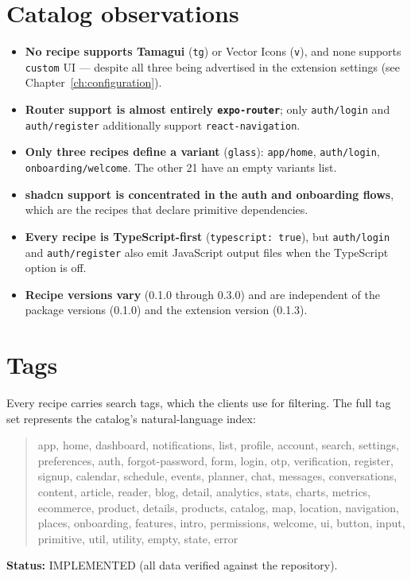 \section{Catalog observations}

\begin{itemize}
  \item \textbf{No recipe supports Tamagui} (\texttt{tg}) or Vector Icons
        (\texttt{v}), and none supports \texttt{custom} UI --- despite all three
        being advertised in the extension settings (see
        Chapter~\ref{ch:configuration}).
  \item \textbf{Router support is almost entirely \texttt{expo-router}}; only
        \texttt{auth/login} and \texttt{auth/register} additionally support
        \texttt{react-navigation}.
  \item \textbf{Only three recipes define a variant} (\texttt{glass}):
        \texttt{app/home}, \texttt{auth/login}, \texttt{onboarding/welcome}. The
        other 21 have an empty variants list.
  \item \textbf{shadcn support is concentrated in the auth and onboarding
        flows}, which are the recipes that declare primitive dependencies.
  \item \textbf{Every recipe is TypeScript-first} (\texttt{typescript: true}), but
        \texttt{auth/login} and \texttt{auth/register} also emit JavaScript output
        files when the TypeScript option is off.
  \item \textbf{Recipe versions vary} (0.1.0 through 0.3.0) and are independent of
        the package versions (0.1.0) and the extension version (0.1.3).
\end{itemize}

\section{Tags}

Every recipe carries search tags, which the clients use for filtering. The full
tag set represents the catalog's natural-language index:

\begin{quote}
\ttfamily\small
app, home, dashboard, notifications, list, profile, account, search, settings,
preferences, auth, forgot-password, form, login, otp, verification, register,
signup, calendar, schedule, events, planner, chat, messages, conversations,
content, article, reader, blog, detail, analytics, stats, charts, metrics,
ecommerce, product, details, products, catalog, map, location, navigation,
places, onboarding, features, intro, permissions, welcome, ui, button, input,
primitive, util, utility, empty, state, error
\end{quote}

\textbf{Status:} IMPLEMENTED (all data verified against the repository).
